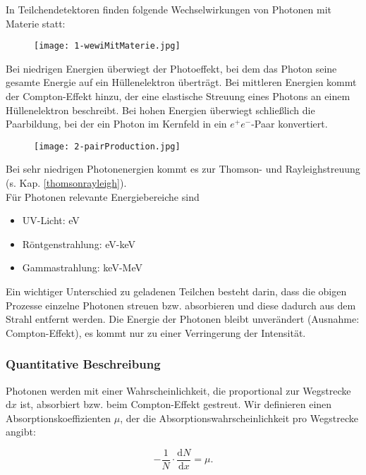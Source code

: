 \FloatBarrier
In Teilchendetektoren finden folgende Wechselwirkungen von Photonen mit Materie statt:

\begin{figure}[H]
	\centering
	\texttt{[image: 1-wewiMitMaterie.jpg]}
\end{figure}

Bei niedrigen Energien überwiegt der Photoeffekt, bei dem das Photon seine gesamte Energie auf ein
Hüllenelektron überträgt. Bei mittleren Energien kommt der Compton-Effekt hinzu, der eine elastische
Streuung eines Photons an einem Hüllenelektron beschreibt. Bei hohen Energien überwiegt schließlich
die Paarbildung, bei der ein Photon im Kernfeld in ein $e^+e^-$-Paar konvertiert.

\begin{figure}
	\centering
	\texttt{[image: 2-pairProduction.jpg]}
\end{figure}

Bei sehr niedrigen Photonenergien kommt es zur Thomson- und Rayleighstreuung (s. Kap.
\ref{thomsonrayleigh}).
\\
Für Photonen relevante Energiebereiche sind  

\begin{itemize}
  \item UV-Licht: eV
  \item Röntgenstrahlung: eV-keV
  \item Gammastrahlung: keV-MeV
\end{itemize}

Ein wichtiger Unterschied zu geladenen Teilchen besteht darin, dass die obigen Prozesse einzelne
Photonen streuen bzw. absorbieren und diese dadurch aus dem Strahl entfernt werden. Die Energie der
Photonen bleibt unverändert (Ausnahme: Compton-Effekt), es kommt nur zu einer Verringerung der
Intensität.

\FloatBarrier
\subsubsection*{Quantitative Beschreibung}

Photonen werden mit einer Wahrscheinlichkeit, die proportional zur Wegstrecke $\mathrm{d}x$ ist,
absorbiert bzw. beim Compton-Effekt gestreut. Wir definieren einen Absorptionskoeffizienten $\mu$,
der die Absorptionswahrscheinlichkeit pro Wegstrecke angibt:

\[ -\frac{1}{N}\cdot\frac{\mathrm{d}N}{\mathrm{d}x}=\mu.\]

